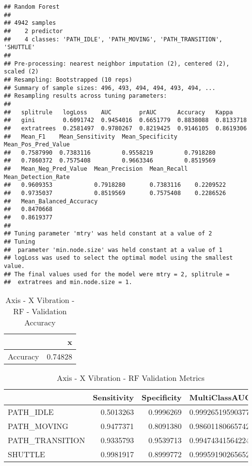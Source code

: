 \documentclass[]{article}
\begin{document}
\begin{verbatim}
## Random Forest 
## 
## 4942 samples
##    2 predictor
##    4 classes: 'PATH_IDLE', 'PATH_MOVING', 'PATH_TRANSITION', 'SHUTTLE' 
## 
## Pre-processing: nearest neighbor imputation (2), centered (2), scaled (2) 
## Resampling: Bootstrapped (10 reps) 
## Summary of sample sizes: 496, 493, 494, 494, 493, 494, ... 
## Resampling results across tuning parameters:
## 
##   splitrule   logLoss    AUC        prAUC      Accuracy   Kappa    
##   gini        0.6091742  0.9454016  0.6651779  0.8838088  0.8133718
##   extratrees  0.2581497  0.9780267  0.8219425  0.9146105  0.8619306
##   Mean_F1    Mean_Sensitivity  Mean_Specificity  Mean_Pos_Pred_Value
##   0.7587990  0.7383116         0.9558219         0.7918280          
##   0.7860372  0.7575408         0.9663346         0.8519569          
##   Mean_Neg_Pred_Value  Mean_Precision  Mean_Recall  Mean_Detection_Rate
##   0.9609353            0.7918280       0.7383116    0.2209522          
##   0.9735037            0.8519569       0.7575408    0.2286526          
##   Mean_Balanced_Accuracy
##   0.8470668             
##   0.8619377             
## 
## Tuning parameter 'mtry' was held constant at a value of 2
## Tuning
##  parameter 'min.node.size' was held constant at a value of 1
## logLoss was used to select the optimal model using the smallest value.
## The final values used for the model were mtry = 2, splitrule =
##  extratrees and min.node.size = 1.
\end{verbatim}

\begin{table}[!h]

\caption{\label{tab:sensor-x-vib-rf-results}Axis - X Vibration - RF - Validation Accuracy}
\centering
\begin{tabular}[t]{lr}
\toprule
  & x\\
\midrule
Accuracy & 0.74828\\
\bottomrule
\end{tabular}
\end{table}

\begin{table}[!h]

\caption{\label{tab:sensor-x-vib-rf-results}Axis - X Vibration - RF Validation Metrics}
\centering
\begin{tabular}[t]{lrrl}
\toprule
  & Sensitivity & Specificity & MultiClassAUC\\
\midrule
PATH\_IDLE & 0.5013263 & 0.9996269 & 0.99926519590377\\
PATH\_MOVING & 0.9477371 & 0.8091380 & 0.986011806657429\\
PATH\_TRANSITION & 0.9335793 & 0.9539713 & 0.994743415642249\\
SHUTTLE & 0.9981917 & 0.8999772 & 0.999591902656526\\
\bottomrule
\end{tabular}
\end{table}
\end{document}
